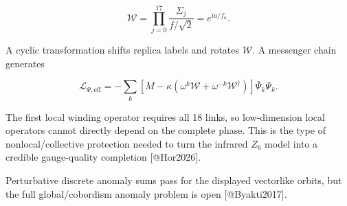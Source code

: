 \documentclass[
]{article}
\begin{document}
\[
\mathcal W
=\prod_{j=0}^{17}\frac{\Sigma_j}{f/\sqrt2}
=e^{ia/f_a}.
\]

A cyclic transformation shifts replica labels and rotates
\(\mathcal W\). A messenger chain generates

\[
\mathcal L_{\Psi,\mathrm{eff}}
=-\sum_k\left[
M-\kappa(\omega^k\mathcal W+\omega^{-k}\mathcal W^\dagger)
\right]\bar\Psi_k\Psi_k.
\]

The first local winding operator requires all 18 links, so low-dimension
local operators cannot directly depend on the complete phase. This is
the type of nonlocal/collective protection needed to turn the infrared
\(Z_6\) model into a credible gauge-quality completion {[}@Hor2026{]}.

Perturbative discrete anomaly sums pass for the displayed vectorlike
orbits, but the full global/cobordism anomaly problem is open
{[}@Byakti2017{]}.
\end{document}
